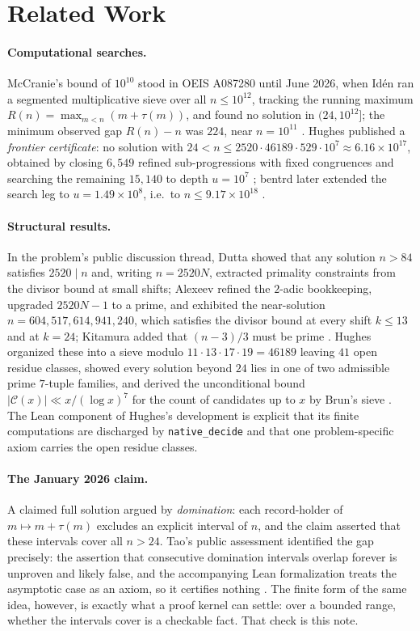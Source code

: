 \documentclass[11pt]{article}
\newcommand{\tdiv}{\tau}
\newcommand{\lean}[1]{\texttt{#1}}
\begin{document}
\section{Related Work}\label{sec:related}

\paragraph{Computational searches.}
McCranie's bound of $10^{10}$ stood in OEIS A087280 until June 2026,
when Id\'en ran a segmented multiplicative sieve over all
$n \le 10^{12}$, tracking the running maximum
$R(n) = \max_{m<n}(m + \tdiv(m))$, and found no solution in
$(24, 10^{12}]$; the minimum observed gap $R(n) - n$ was $224$, near
$n = 10^{11}$ \cite{iden}. Hughes published a \emph{frontier
certificate}: no solution with $24 < n \le 2520 \cdot 46189 \cdot 529
\cdot 10^7 \approx 6.16 \times 10^{17}$, obtained by closing $6{,}549$
refined sub-progressions with fixed congruences and searching the
remaining $15{,}140$ to depth $u = 10^7$ \cite{hughesrepo}; bentrd
later extended the search leg to $u = 1.49 \times 10^8$, i.e.\ to
$n \le 9.17 \times 10^{18}$ \cite{bentrd}.

\paragraph{Structural results.}
In the problem's public discussion thread, Dutta showed that any
solution $n > 84$ satisfies $2520 \mid n$ and, writing $n = 2520N$,
extracted primality constraints from the divisor bound at small shifts;
Alexeev refined the $2$-adic bookkeeping, upgraded $2520N - 1$ to a
prime, and exhibited the near-solution $n = 604{,}517{,}614{,}941{,}240$,
which satisfies the divisor bound at every shift $k \le 13$ and at
$k = 24$; Kitamura added that $(n-3)/3$ must be prime \cite{bloom647}.
Hughes organized these into a sieve modulo
$11 \cdot 13 \cdot 17 \cdot 19 = 46189$ leaving $41$ open residue
classes, showed every solution beyond $24$ lies in one of two
admissible prime $7$-tuple families, and derived the unconditional
bound $|\mathcal{C}(x)| \ll x/(\log x)^7$ for the count of candidates
up to $x$ by Brun's sieve \cite{hughesrepo}. The Lean component of
Hughes's development is explicit that its finite computations are
discharged by \lean{native\_decide} and that one problem-specific
axiom carries the open residue classes.

\paragraph{The January 2026 claim.}
A claimed full solution \cite{agbanwa} argued by \emph{domination}:
each record-holder of $m \mapsto m + \tdiv(m)$ excludes an explicit
interval of $n$, and the claim asserted that these intervals cover all
$n > 24$. Tao's public assessment identified the gap precisely: the
assertion that consecutive domination intervals overlap forever is
unproven and likely false, and the accompanying Lean formalization
treats the asymptotic case as an axiom, so it certifies nothing
\cite{bloom647}. The finite form of the same idea, however, is exactly
what a proof kernel can settle: over a bounded range, whether the
intervals cover is a checkable fact. That check is this note.
\end{document}
